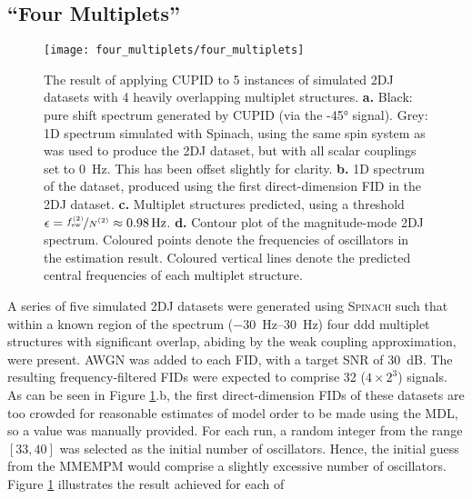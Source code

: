 \subsection{``Four Multiplets''}
\label{subsec:four-mp}
\begin{figure}
    \centering
    \texttt{[image: four\_multiplets/four\_multiplets]}
    \caption[
        The result of applying \acs{CUPID} to 5 instances of simulated
        \acs{2DJ} datasets with 4 heavily overlapping multiplet structures.
    ]{
        The result of applying \ac{CUPID} to 5 instances of simulated \ac{2DJ}
        datasets with 4 heavily overlapping multiplet structures.
        \textbf{a.} Black: pure shift spectrum generated by \ac{CUPID} (via the
        \ang{-45} signal).
        Grey: \ac{1D} spectrum simulated with Spinach, using the same spin
        system as was used to produce the \ac{2DJ} dataset, but with all scalar
        couplings set to \qty{0}{\hertz}. This has been offset slightly for
        clarity.
        \textbf{b.} \ac{1D} spectrum of the dataset, produced using the first
        direct-dimension \ac{FID} in the \ac{2DJ} dataset.
        \textbf{c.} Multiplet structures predicted, using a threshold $\epsilon
        = \nicefrac{\fswtwo}{\Ntwo} \approx \qty{0.98}{\hertz}$.
        \textbf{d.} Contour plot of the magnitude-mode \ac{2DJ} spectrum.
        Coloured points denote the frequencies of oscillators in the
        estimation result. Coloured vertical lines denote the predicted central
        frequencies of each multiplet structure.
    }
    \label{fig:four-multiplets}
\end{figure}
A series of five simulated \ac{2DJ} datasets
were generated using \textsc{Spinach} such that within a
known region of the spectrum (\SIrange{-30}{30}{\hertz}) four ddd multiplet
structures with significant overlap, abiding by the weak coupling
approximation, were present. \ac{AWGN} was added to each \ac{FID}, with a
target \ac{SNR} of \qty{30}{\deci\bel}.
The resulting frequency-filtered \acp{FID} were expected to comprise 32 ($4 \times
2^3$) signals. As can be seen in Figure
\ref{fig:four-multiplets}.b, the first direct-dimension \acp{FID} of these
datasets are too crowded for reasonable estimates of model order to be made
using the \ac{MDL}, so a value was manually provided. For each run, a random
integer from the range $[33, 40]$ was selected as the initial number of
oscillators. Hence, the initial guess from the \ac{MMEMPM} would comprise a
slightly excessive number of oscillators.
Figure \ref{fig:four-multiplets} illustrates the result achieved for each of
